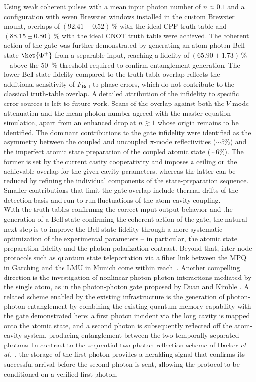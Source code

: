 Using weak coherent pulses with a mean input photon number of $\bar{n}\approx0.1$ and a configuration with seven Brewster windows installed in the custom Brewster mount, overlaps of $(92.41 \pm 0.52)\,\%$ with the ideal CPF truth table and $(88.15 \pm 0.86)\,\%$ with the ideal CNOT truth table were achieved. The coherent action of the gate was further demonstrated by generating an atom-photon Bell state $\ket{\Phi^+}$ from a separable input, reaching a fidelity of $(65.90 \pm 1.73)\,\%$ -- above the \SI{50}{\percent} threshold required to confirm entanglement generation. The lower Bell-state fidelity compared to the truth-table overlap reflects the additional sensitivity of $F_{\text{Bell}}$ to phase errors, which do not contribute to the classical truth-table overlap. A detailed attribution of the infidelity to specific error sources is left to future work. Scans of the overlap against both the $V$-mode attenuation and the mean photon number agreed with the master-equation simulation, apart from an enhanced drop at $\bar{n} \gtrsim 1$ whose origin remains to be identified. The dominant contributions to the gate infidelity were identified as the asymmetry between the coupled and uncoupled $\pi$-mode reflectivities ($\sim5\%$) and the imperfect atomic state preparation of the coupled atomic state ($\sim6\%$). The former is set by the current cavity cooperativity and imposes a ceiling on the achievable overlap for the given cavity parameters, whereas the latter can be reduced by refining the individual components of the state-preparation sequence. Smaller contributions that limit the gate overlap include thermal drifts of the detection basis and run-to-run fluctuations of the atom-cavity coupling.\\

With the truth tables confirming the correct input-output behavior and the generation of a Bell state confirming the coherent action of the gate, the natural next step is to improve the Bell state fidelity through a more systematic optimization of the experimental parameters -- in particular, the atomic state preparation fidelity and the photon polarization contrast. Beyond that, inter-node protocols such as quantum state teleportation via a fiber link between the MPQ in Garching and the LMU in Munich come within reach~\cite{TelecomConnectionMPQLMU}. Another compelling direction is the investigation of nonlinear photon-photon interactions mediated by the single atom, as in the photon-photon gate proposed by Duan and Kimble \cite{DuanKimble2004}. A related scheme enabled by the existing infrastructure is the generation of photon-photon entanglement by combining the existing quantum memory capability with the gate demonstrated here: a first photon incident via the long cavity is mapped onto the atomic state, and a second photon is subsequently reflected off the atom-cavity system, producing entanglement between the two temporally separated photons. In contrast to the sequential two-photon reflection scheme of Hacker \textit{et al.}~\cite{Hacker2016}, the storage of the first photon provides a heralding signal that confirms its successful arrival before the second photon is sent, allowing the protocol to be conditioned on a verified first photon.
